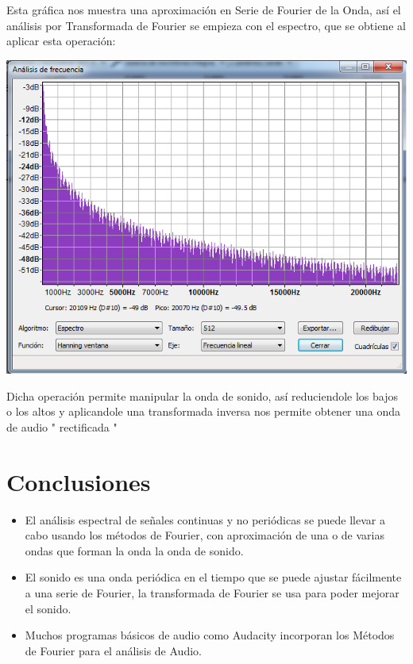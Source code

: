 \documentclass[10pt,a4paper]{book}
\begin{document}
Esta gráfica nos muestra una aproximación en Serie de Fourier de la Onda, así el análisis por Transformada de Fourier se empieza con el espectro, que se obtiene al aplicar esta operación:
\begin{center}
	\includegraphics[scale=0.5]{Espectro.png} 
\end{center}

Dicha operación permite manipular la onda de sonido, así reduciendole los bajos o los altos y aplicandole una transformada inversa nos permite obtener una onda de audio " rectificada "\\


\section{Conclusiones}

\begin{itemize}

\item El análisis espectral de señales continuas y no periódicas se puede llevar a cabo usando los métodos de Fourier, con aproximación de una o de varias ondas que forman la onda la onda de sonido.
\item El sonido es una onda periódica en el tiempo que se puede ajustar fácilmente a una serie de Fourier, la transformada de Fourier se usa para poder mejorar el sonido. 
\item Muchos programas básicos de audio como Audacity incorporan los Métodos de Fourier para el análisis de Audio.


\end{itemize}
\end{document}
